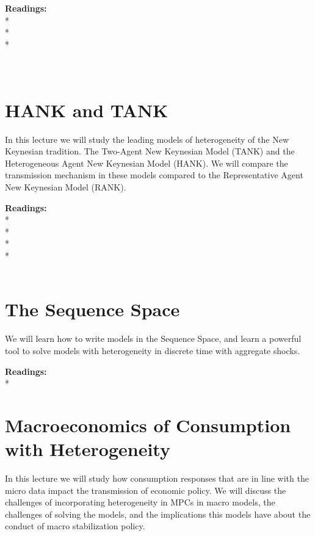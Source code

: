 \documentclass [12pt]{article}
\begin{document}
\noindent\textbf{Readings:}\\
*\\
*\\
*\\
 \\
\\


\section{HANK and TANK}

In this lecture we will study the leading models of heterogeneity of the New Keynesian tradition. The Two-Agent New Keynesian Model (TANK) and the Heterogeneous Agent New Keynesian Model (HANK). We will compare the transmission mechanism in these models compared to the Representative Agent New Keynesian Model (RANK).

\noindent\textbf{Readings:}\\
*\\
*\\
*\\
* \\
\\


\section{The Sequence Space}

We will learn how to write models in the Sequence Space, and learn a powerful tool to solve models with heterogeneity in discrete time with aggregate shocks.

\noindent\textbf{Readings:}\\
*\\


\section{Macroeconomics of Consumption with Heterogeneity}

In this lecture we will study how consumption responses that are in line with the micro data impact the transmission of economic policy. We will discuss the challenges of incorporating heterogeneity in MPCs in macro models, the challenges of solving the models, and the implications this models have about the conduct of macro stabilization policy.
\end{document}
